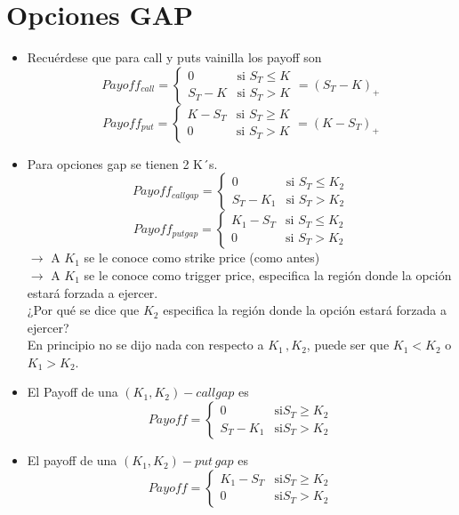 \documentclass[12pts]{extarticle}
\begin{document}
\section{Opciones GAP}
\begin{itemize}
\item Recuérdese que para call y puts vainilla los payoff son 
$$Payoff_{call}= \begin{cases} 0 & \mbox{si } S_T\leq K  \\
                                            S_T-K & \mbox{si } S_T > K \end{cases} =(S_T -K)_+$$ 
$$Payoff_{put}= \begin{cases} K- S_T & \mbox{si } S_T \geq K  \\
                                            0 & \mbox{si } S_T > K \end{cases} =(K-S_T)_+$$
\item Para opciones gap se tienen 2 K´s.
$$Payoff_{call gap}=\begin{cases} 0 & \mbox{si } S_T \leq K_2  \\
                                            S_T-K_1 & \mbox{si } S_T > K_2 \end{cases} $$
$$Payoff_{put gap}=  \begin{cases} K_1-S_T & \mbox{si } S_T \leq K_2  \\
                                            0 & \mbox{si } S_T > K_2 \end{cases} $$
$\rightarrow$ A $K_1$ se le conoce como strike price (como antes) \\
$\rightarrow$ A $K_1$ se le conoce como trigger price, especifica la región donde la opción estará forzada a ejercer. \\
¿Por qué se dice que $K_2$ especifica la región donde la opción estará forzada a ejercer?\\ 
En principio no se dijo nada con respecto a $K_1 \, , K_2$, puede ser que $K_1<K_2$ o $K_1>K_2$.
\item El Payoff de una $(K_1,K_2)-call gap$ es 
$$Payoff=\begin{cases} 0 & \mbox{si} S_T\geq K_2 \\ 
                                        S_T-K_1 & \mbox{si} S_T>K_2 \end{cases} $$
\vfill 
\item El payoff de una $(K_1,K_2)-put \, gap$ es 
$$Payoff=\begin{cases} K_1-S_T & \mbox{si} S_T\geq K_2 \\ 
                                        0 & \mbox{si} S_T>K_2 \end{cases} $$
\vfill 

\end{itemize}
\end{document}
